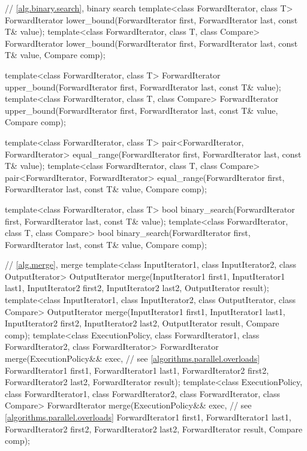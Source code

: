 \begin{codeblock}
{  // \ref{alg.binary.search}, binary search
  template<class ForwardIterator, class T>
    ForwardIterator lower_bound(ForwardIterator first, ForwardIterator last,
                                const T& value);
  template<class ForwardIterator, class T, class Compare>
    ForwardIterator lower_bound(ForwardIterator first, ForwardIterator last,
                                const T& value, Compare comp);

  template<class ForwardIterator, class T>
    ForwardIterator upper_bound(ForwardIterator first, ForwardIterator last,
                                const T& value);
  template<class ForwardIterator, class T, class Compare>
    ForwardIterator upper_bound(ForwardIterator first, ForwardIterator last,
                                const T& value, Compare comp);

  template<class ForwardIterator, class T>
    pair<ForwardIterator, ForwardIterator>
      equal_range(ForwardIterator first, ForwardIterator last,
                  const T& value);
  template<class ForwardIterator, class T, class Compare>
    pair<ForwardIterator, ForwardIterator>
      equal_range(ForwardIterator first, ForwardIterator last,
                  const T& value, Compare comp);

  template<class ForwardIterator, class T>
    bool binary_search(ForwardIterator first, ForwardIterator last,
                       const T& value);
  template<class ForwardIterator, class T, class Compare>
    bool binary_search(ForwardIterator first, ForwardIterator last,
                       const T& value, Compare comp);

  // \ref{alg.merge}, merge
  template<class InputIterator1, class InputIterator2, class OutputIterator>
    OutputIterator merge(InputIterator1 first1, InputIterator1 last1,
                         InputIterator2 first2, InputIterator2 last2,
                         OutputIterator result);
  template<class InputIterator1, class InputIterator2, class OutputIterator,
           class Compare>
    OutputIterator merge(InputIterator1 first1, InputIterator1 last1,
                         InputIterator2 first2, InputIterator2 last2,
                         OutputIterator result, Compare comp);
  template<class ExecutionPolicy, class ForwardIterator1, class ForwardIterator2,
           class ForwardIterator>
    ForwardIterator merge(ExecutionPolicy&& exec, // see \ref{algorithms.parallel.overloads}
                         ForwardIterator1 first1, ForwardIterator1 last1,
                         ForwardIterator2 first2, ForwardIterator2 last2,
                         ForwardIterator result);
  template<class ExecutionPolicy, class ForwardIterator1, class ForwardIterator2,
           class ForwardIterator, class Compare>
    ForwardIterator merge(ExecutionPolicy&& exec, // see \ref{algorithms.parallel.overloads}
                         ForwardIterator1 first1, ForwardIterator1 last1,
                         ForwardIterator2 first2, ForwardIterator2 last2,
                         ForwardIterator result, Compare comp);

}
\end{codeblock}
